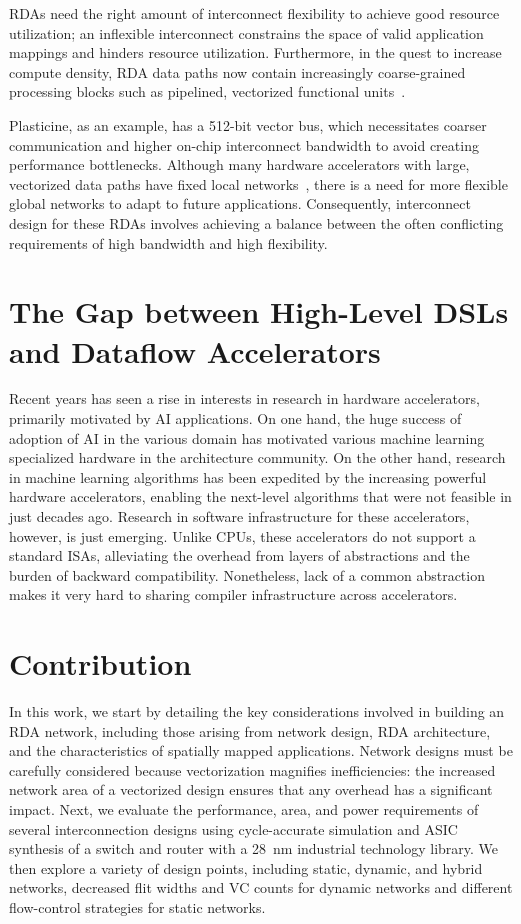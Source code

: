 RDAs need the right amount of interconnect flexibility to achieve good resource utilization; 
an inflexible interconnect constrains the space of
valid application mappings and hinders resource utilization. 
Furthermore, 
in the quest to increase compute density, RDA data paths now 
contain increasingly coarse-grained processing blocks such as pipelined, vectorized functional 
units~\cite{plasticine, piperench, xilinx-acap}.

Plasticine, as an example, has a 512-bit vector bus, which necessitates coarser communication and higher on-chip interconnect bandwidth to avoid creating performance bottlenecks. 
Although many hardware accelerators with large, vectorized data paths have fixed local networks~\cite{brainwave}, there is a need for more
flexible global networks to adapt to future applications.
Consequently, interconnect design for these RDAs involves achieving a balance between the often conflicting requirements of high bandwidth and high flexibility.

\section{The Gap between High-Level DSLs and Dataflow Accelerators}
Recent years has seen a rise in interests in research in hardware accelerators, primarily
motivated by AI applications. 
On one hand, the huge success of adoption of AI in the various domain has motivated various machine learning
specialized hardware in the architecture community.
On the other hand, research in machine learning algorithms has been expedited by the increasing
powerful hardware accelerators, enabling the next-level algorithms that were not feasible in just
decades ago.
Research in software infrastructure for these accelerators, however, is just emerging.
Unlike CPUs, these accelerators do not support a standard ISAs, alleviating the overhead from
layers of abstractions and the burden of backward compatibility. 
Nonetheless, lack of a common abstraction makes it very hard to sharing compiler infrastructure
across accelerators. 

\section{Contribution}

In this work, we start by detailing the key considerations involved in building an RDA network, including those arising from network design, RDA architecture, and the characteristics of spatially mapped applications.
Network designs must be carefully considered because vectorization magnifies inefficiencies: the increased network area of a vectorized design ensures that any overhead has a significant impact.
Next, we evaluate the performance, area, and power requirements of several interconnection designs using cycle-accurate simulation and ASIC synthesis of a switch and router with a \SI{28}{nm} industrial technology library.
We then explore a variety of design points, including static, dynamic, and hybrid networks, decreased flit widths and VC counts for dynamic networks and different flow-control strategies for static networks.

